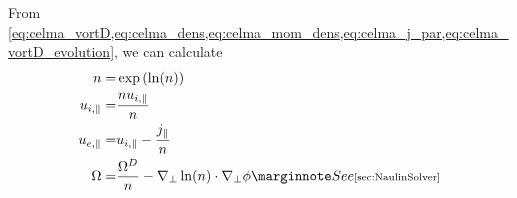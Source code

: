 %
From \cref{eq:celma_vortD,eq:celma_dens,eq:celma_mom_dens,eq:celma_j_par,eq:celma_vortD_evolution}, we can calculate
%
\begin{align*}
    n       =&\exp\L(\ln(n)\R)\\
    u_{i,\|}=&\frac{n u_{i,\|}}{n}\\
    u_{e,\|}=&u_{i,\|} - \frac{j_{\|}}{n}\\
    \Om     =& \frac{\Om^D}{n} - \grad_\perp \ln(n)\cdot \grad_\perp \phi
    \note{See \cref{sec:NaulinSolver}}
\end{align*}
